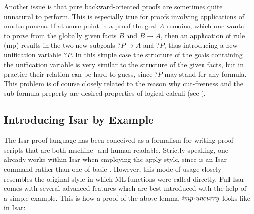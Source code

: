 Another issue is that pure backward-oriented proofs are sometimes quite
unnatural to perform. This is especially true for proofs involving applications
of modus ponens. If at some point in a proof the goal $A$ remains, which one
wants to prove from the globally given facts $B$ and $B \longrightarrow A$, then an
application of rule (mp) results in the two new subgoals $?P \longrightarrow A$ and $?P$, thus
introducing a new unification variable $?P$. In this simple case the structure
of the goals containing the unification variable is very similar to the structure
of the given facts, but in practice their relation can be hard to guess, since
$?P$ may stand for any formula. This problem is of course closely related to the
reason why cut-freeness and the sub-formula property are desired properties of
logical calculi (see \cite{Andrews00}).

\subsection{Introducing Isar by Example}
The Isar proof language has been conceived as a formalism for writing proof
scripts that are both machine- and human-readable. Strictly speaking, one already
works within Isar when employing the apply style, since  is an
Isar command rather than one of basic \Isabelle. However, this mode of usage
closely resembles the original \Isabelle style in which ML functions were called
directly. Full Isar comes with several advanced features which are best
introduced with the help of a simple example. This is how a proof of the above
lemma $\mbox{\emph{imp-uncurry}}$ looks like in Isar:


